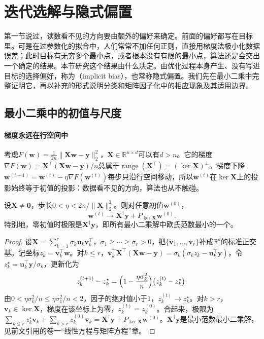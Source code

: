 \section{迭代选解与隐式偏置}
\label{sec:opt-fit-implicit-bias}

第一节说过，读数看不见的方向要由额外的偏好来确定。前面的偏好都写在目标里。可是在过参数化的拟合中，人们常常不加任何正则，直接用梯度法极小化数据误差；此时目标有无穷多个最小点，或者根本没有有限的最小点，算法还是会交出一个确定的结果。本节研究这个结果由什么决定。由优化过程本身产生、没有写进目标的选择偏好，称为（implicit bias），也常称隐式偏置。我们先在最小二乘中完整证明它，再以补充的形式说明分类和矩阵因子化中的相应现象及其适用边界。

\subsection{最小二乘中的初值与尺度}
\label{sec:opt-fit-implicit-least-squares}

\paragraph{梯度永远在行空间中}
考虑$F(\bm w)=\frac1{2n}\|\bm X\bm w-\bm y\|_2^2$，$\bm X\in\mathbb R^{n\times d}$可以有$d>n$。它的梯度$\nabla F(\bm w)=\bm X^\top(\bm X\bm w-\bm y)/n$总属于$\operatorname{range}(\bm X^\top)=(\ker\bm X)^\perp$。梯度下降$\bm w^{(t+1)}=\bm w^{(t)}-\eta\nabla F(\bm w^{(t)})$每步只沿行空间移动，所以$\bm w^{(t)}$在$\ker\bm X$上的投影始终等于初值的投影：数据看不见的方向，算法也从不触碰。

\begin{theorem}[梯度下降的最小二乘极限]
\label{thm:opt-fit-gd-limit}
设$\bm X\ne\bm 0$，步长$0<\eta<2n/\|\bm X\|_2^2$。则对任意初值$\bm w^{(0)}$，
\[
  \bm w^{(t)}\to\bm X^\dagger\bm y+P_{\ker\bm X}\bm w^{(0)} .
\]
特别地，零初值时极限是$\bm X^\dagger\bm y$，即所有最小二乘解中欧氏范数最小的一个。
\end{theorem}

\begin{proof}
设$\bm X=\sum_{k=1}^r\sigma_k\bm u_k\bm v_k^\top$，$\sigma_1\ge\cdots\ge\sigma_r>0$，把$\{\bm v_1,\dots,\bm v_r\}$补成$\mathbb R^d$的标准正交基。记坐标$z_k=\bm v_k^\top\bm w$。对$k\le r$，$\bm v_k^\top\bm X^\top(\bm X\bm w-\bm y)=\sigma_k(\sigma_kz_k-\bm u_k^\top\bm y)$，令$z_k^\star=\bm u_k^\top\bm y/\sigma_k$，更新化为
\[
  z_k^{(t+1)}-z_k^\star=\Bigl(1-\frac{\eta\sigma_k^2}n\Bigr)\bigl(z_k^{(t)}-z_k^\star\bigr).
\]
由$0<\eta\sigma_k^2/n\le\eta\sigma_1^2/n<2$，因子的绝对值小于$1$，$z_k^{(t)}\to z_k^\star$。对$k>r$，$\bm v_k\in\ker\bm X$，梯度在该坐标上为零，$z_k^{(t)}=z_k^{(0)}$。合起来，极限为$\sum_{k\le r}z_k^\star\bm v_k+\sum_{k>r}z_k^{(0)}\bm v_k=\bm X^\dagger\bm y+P_{\ker\bm X}\bm w^{(0)}$。$\bm X^\dagger\bm y$是最小范数最小二乘解，见前文引用的卷一“线性方程与矩阵方程”章。
\end{proof}


